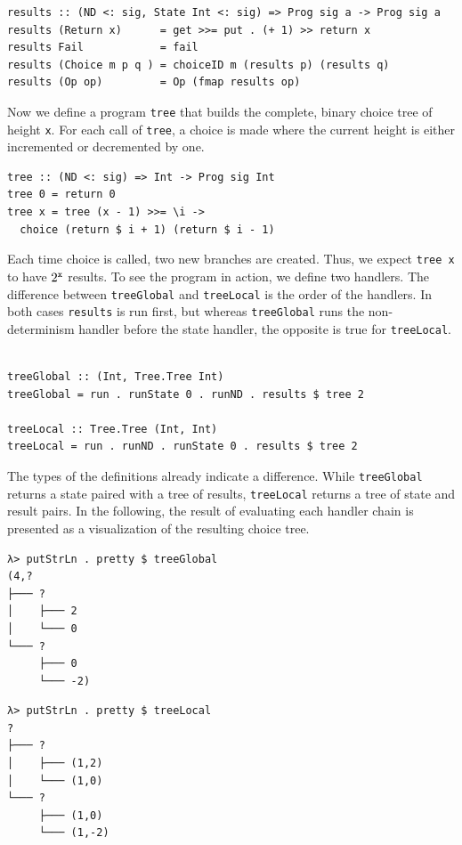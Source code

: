 \documentclass[a4paper, 11pt, fleqn, twoside, abstract=on]{scrreprt}
\newcommand{\hinl}[1]{\texttt{#1}}
\begin{document}
\begin{verbatim}
results :: (ND <: sig, State Int <: sig) => Prog sig a -> Prog sig a
results (Return x)      = get >>= put . (+ 1) >> return x
results Fail            = fail
results (Choice m p q ) = choiceID m (results p) (results q)
results (Op op)         = Op (fmap results op)
\end{verbatim}

Now we define a program \hinl{tree} that builds the complete, binary choice tree of height \hinl{x}.
For each call of \hinl{tree}, a choice is made where the current height is either incremented or decremented by one.

\begin{verbatim}
tree :: (ND <: sig) => Int -> Prog sig Int
tree 0 = return 0
tree x = tree (x - 1) >>= \i -> 
  choice (return $ i + 1) (return $ i - 1)
\end{verbatim}

Each time choice is called, two new branches are created.
Thus, we expect \hinl{tree x} to have $2^\text{\hinl{x}}$ results.
To see the program in action, we define two handlers.
The difference between \hinl{treeGlobal} and \hinl{treeLocal} is the order of the handlers.
In both cases \hinl{results} is run first, but whereas \hinl{treeGlobal} runs the non-determinism handler before the state handler, the opposite is true for \hinl{treeLocal}.

\begin{verbatim}

treeGlobal :: (Int, Tree.Tree Int)
treeGlobal = run . runState 0 . runND . results $ tree 2

treeLocal :: Tree.Tree (Int, Int)
treeLocal = run . runND . runState 0 . results $ tree 2
\end{verbatim}

The types of the definitions already indicate a difference.
While \hinl{treeGlobal} returns a state paired with a tree of results, \hinl{treeLocal} returns a tree of state and result pairs.
In the following, the result of evaluating each handler chain is presented as a visualization of the resulting choice tree.

\vspace{0.32cm}

\begin{minipage}{.465 \linewidth}
\begin{verbatim}
λ> putStrLn . pretty $ treeGlobal
(4,?
├─── ?
│    ├─── 2
│    └─── 0
└─── ?
     ├─── 0
     └─── -2)
\end{verbatim}
\end{minipage}
\hfill
\vline
\hfill
\begin{minipage}{.475 \linewidth}
\begin{verbatim}
λ> putStrLn . pretty $ treeLocal
?
├─── ?
│    ├─── (1,2)
│    └─── (1,0)
└─── ?
     ├─── (1,0)
     └─── (1,-2)
\end{verbatim}
\end{minipage}
\end{document}

